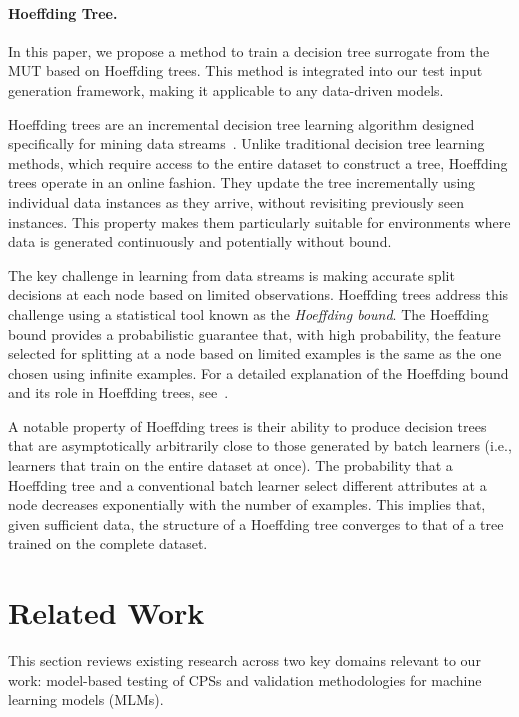 \documentclass[
]{ceurart}
\theoremstyle{definition}
\begin{document}
\paragraph{Hoeffding Tree.}

In this paper, we propose a method to train a decision tree surrogate from the MUT based on Hoeffding trees. This method is integrated into our test input generation framework, making it applicable to any data-driven models.

Hoeffding trees are an incremental decision tree learning algorithm designed specifically for mining data streams~\cite{hoeffding}. Unlike traditional decision tree learning methods, which require access to the entire dataset to construct a tree, Hoeffding trees operate in an online fashion. They update the tree incrementally using individual data instances as they arrive, without revisiting previously seen instances. This property makes them particularly suitable for environments where data is generated continuously and potentially without bound.

The key challenge in learning from data streams is making accurate split decisions at each node based on limited observations. Hoeffding trees address this challenge using a statistical tool known as the \textit{Hoeffding bound}. The Hoeffding bound provides a probabilistic guarantee that, with high probability, the feature selected for splitting at a node based on limited examples is the same as the one chosen using infinite examples. For a detailed explanation of the Hoeffding bound and its role in Hoeffding trees, see~\cite{hoeffding}.

A notable property of Hoeffding trees is their ability to produce decision trees that are asymptotically arbitrarily close to those generated by batch learners (i.e., learners that train on the entire dataset at once).  The probability that a Hoeffding tree and a conventional batch learner select different attributes at a node decreases exponentially with the number of examples. This implies that, given sufficient data, the structure of a Hoeffding tree converges to that of a tree trained on the complete dataset.

\section{Related Work}
\label{sec:related}

This section reviews existing research across two key domains relevant to our work: model-based testing of CPSs and validation methodologies for machine learning models (MLMs).
\end{document}
